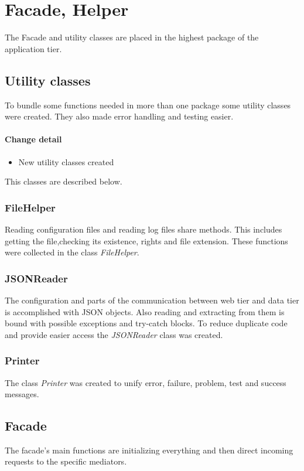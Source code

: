 \section{Facade, Helper}
The Facade and utility classes are placed in the highest package of the application tier.

\subsection{Utility classes}\label{utility}
To bundle some functions needed in more than one package some utility
classes were created. They also made error handling and 
testing easier.

\paragraph{Change detail}
\begin{itemize}
  \item New utility classes created
\end{itemize}

This classes are described below.

\subsubsection{FileHelper}
Reading configuration files and reading log files share methods.
This includes getting the file,checking its existence,
rights and file extension. These functions
were collected in the class \textit{FileHelper}.


\subsubsection{JSONReader}\label{reader}
The configuration and parts of the communication between web tier
and data tier is accomplished with JSON objects. Also reading and
extracting from them is bound with possible exceptions and try-catch blocks.
To reduce duplicate code and provide easier access the \textit{JSONReader} class
was created.

\subsubsection{Printer}
The class \textit{Printer} was created to unify error, failure, problem, test
and success messages.


\subsection{Facade}
The facade's main functions are initializing everything and then direct incoming requests to
the specific mediators.

